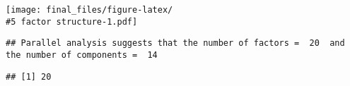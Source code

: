 \documentclass[
]{article}
\newenvironment{Shaded}{\begin{snugshade}}{\end{snugshade}}
\newcommand{\NormalTok}[1]{#1}
\newcommand{\SpecialCharTok}[1]{\textcolor[rgb]{0.00,0.00,0.00}{#1}}
\begin{document}
\texttt{[image: final\_files/figure-latex/\\\#5 factor structure-1.pdf]}

\begin{verbatim}
## Parallel analysis suggests that the number of factors =  20  and the number of components =  14
\end{verbatim}

\begin{Shaded}
\end{Shaded}

\begin{verbatim}
## [1] 20
\end{verbatim}

\begingroup\fontsize{12}{14}\selectfont
\end{document}
